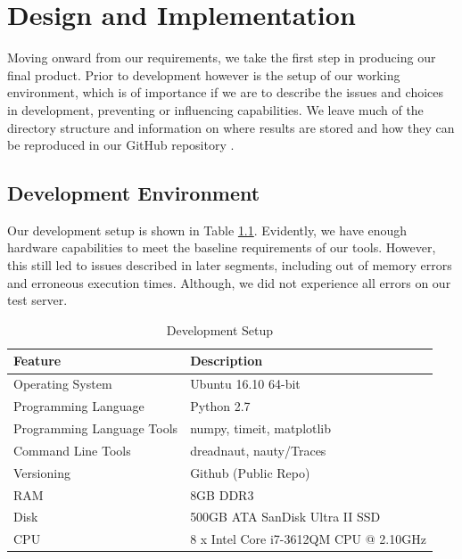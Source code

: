 \chapter{Design and Implementation}

\ifpdf
    \graphicspath{{Chapter3/Figs/Raster/}{Chapter3/Figs/PDF/}{Chapter3/Figs/}}
\else
    \graphicspath{{Chapter3/Figs/Vector/}{Chapter3/Figs/}}
\fi

Moving onward from our requirements, we take the first step in producing our final product. Prior to development however is the setup of our working environment, which is of importance if we are to describe the issues and choices in development, preventing or influencing capabilities. We leave much of the directory structure and information on where results are stored and how they can be reproduced in our GitHub repository \cite{quasipolynomial}.

\section[Development Environment]{Development Environment}
Our development setup is shown in Table \ref{tab:t1}. Evidently, we have enough hardware capabilities to meet the baseline requirements of our tools. However, this still led to issues described in later segments, including out of memory errors and erroneous execution times. Although, we did not experience all errors on our test server. 

\begin{table}
	\caption{Development Setup}
	\centering
	\label{table:good_table}
	\begin{tabular}{l l}
		\toprule
		Feature & Description  \\ 
		\midrule
		Operating System & Ubuntu 16.10 64-bit \\
		Programming Language &  Python 2.7\\
		Programming Language Tools & numpy, timeit, matplotlib\\
		Command Line Tools & dreadnaut, nauty/Traces \\
		Versioning & Github (Public Repo) \\
		RAM & 8GB DDR3 \\
		Disk & 500GB ATA SanDisk Ultra II SSD \\
		CPU & 8 x Intel Core i7-3612QM CPU @ 2.10GHz \\
		\bottomrule
	\end{tabular}
	\label{tab:t1}
\end{table}



